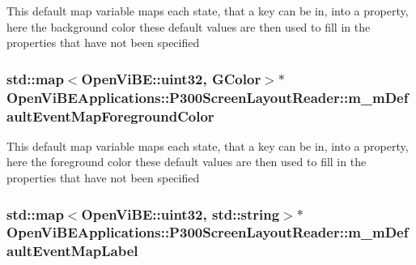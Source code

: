 \label{classOpenViBEApplications_1_1P300ScreenLayoutReader_aa9457e6485c54a8646f7dcae8b487f11}
This default map variable maps each state, that a key can be in, into a property, here the background color these default values are then used to fill in the properties that have not been specified \hypertarget{classOpenViBEApplications_1_1P300ScreenLayoutReader_a3e4e80fcbf42bc3c37f834852149c19a}{
\subsubsection[{m\_\-mDefaultEventMapForegroundColor}]{\setlength{\rightskip}{0pt plus 5cm}std::map$<$OpenViBE::uint32, {\bf GColor}$>$$\ast$ {\bf OpenViBEApplications::P300ScreenLayoutReader::m\_\-mDefaultEventMapForegroundColor}}}
\label{classOpenViBEApplications_1_1P300ScreenLayoutReader_a3e4e80fcbf42bc3c37f834852149c19a}
This default map variable maps each state, that a key can be in, into a property, here the foreground color these default values are then used to fill in the properties that have not been specified \hypertarget{classOpenViBEApplications_1_1P300ScreenLayoutReader_a597b61ffa7cebe96842f68af22f29cc6}{
\subsubsection[{m\_\-mDefaultEventMapLabel}]{\setlength{\rightskip}{0pt plus 5cm}std::map$<$OpenViBE::uint32, std::string$>$$\ast$ {\bf OpenViBEApplications::P300ScreenLayoutReader::m\_\-mDefaultEventMapLabel}}}
\label{classOpenViBEApplications_1_1P300ScreenLayoutReader_a597b61ffa7cebe96842f68af22f29cc6}
